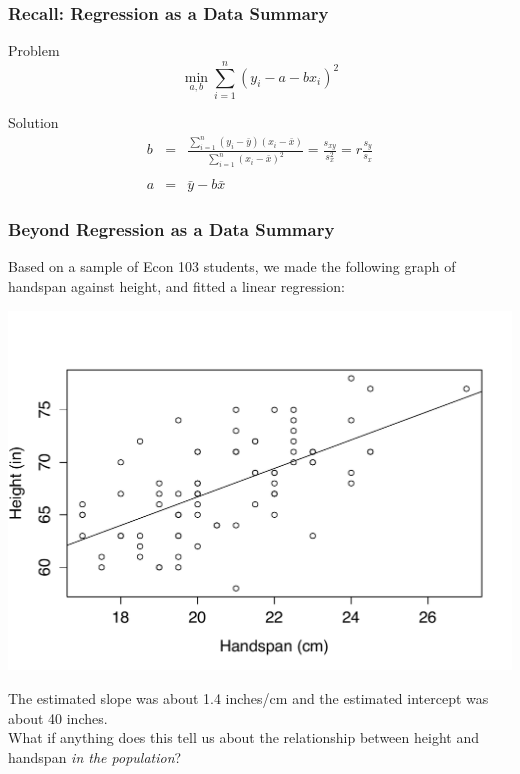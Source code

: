 \documentclass[handout]{beamer}
\begin{document}
\begin{frame}
\frametitle{Recall: Regression as a Data Summary}
	\begin{block}{Problem}
	$$\min_{a,b}  \sum_{i=1}^n (y_i - a - b x_i)^2$$
\end{block}
\begin{block}{Solution}
	\begin{eqnarray*}
		b &=& \frac{\sum_{i=1}^n \left(y_i - \bar{y}\right)\left(x_i - \bar{x} \right)}{\sum_{i=1}^n \left(x_i - \bar{x}\right)^2} = \frac{s_{xy}}{s_x^2} =  r\frac{s_y}{s_x}\\ \\
		a &=& \bar{y} - b\bar{x}
	\end{eqnarray*}
\end{block}
\end{frame}
\begin{frame}
\frametitle{Beyond Regression as a Data Summary}
\small
Based on a sample of Econ 103 students, we made the following graph of handspan against height, and fitted a linear regression:
\begin{center}
\includegraphics[scale = 0.3]{./images/height_handspan_reg}
\end{center}
The estimated slope was about 1.4 inches/cm and the estimated intercept was about 40 inches. \\


\alert{What if anything does this tell us about the relationship between height and handspan \emph{in the population}?}
\end{frame}
\end{document}
